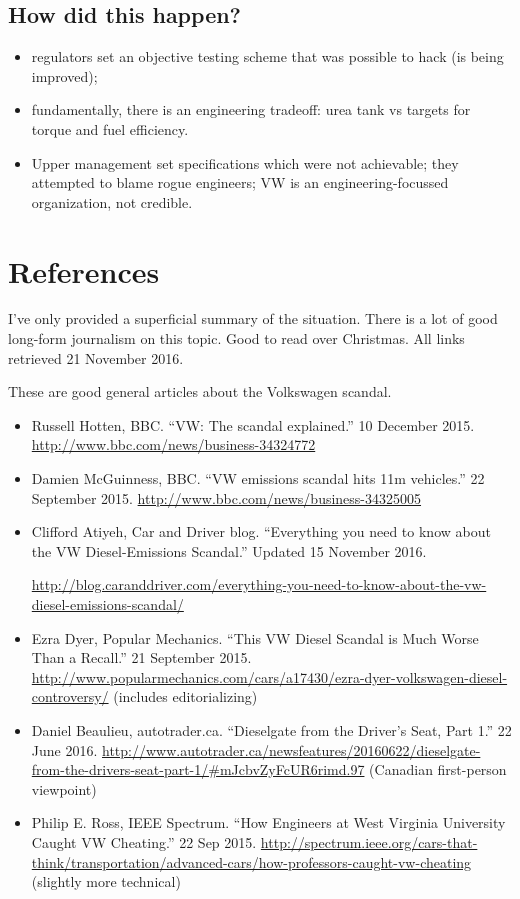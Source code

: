 \documentclass[11pt]{article}
\begin{document}
\subsection*{How did this happen?}
\begin{itemize}[noitemsep]
\item regulators set an objective testing scheme that was possible to hack (is being improved);
\item fundamentally, there is an engineering tradeoff: urea tank vs targets for torque and fuel efficiency.
\item Upper management set specifications which were not achievable; they attempted to blame rogue engineers; VW is an engineering-focussed organization, not credible.
\end{itemize}


\newpage
\section*{References}

I've only provided a superficial summary of the situation. There is a
lot of good long-form journalism on this topic. Good to read over Christmas.
All links retrieved 21 November 2016.

\noindent
These are good general articles about the Volkswagen scandal.

\begin{itemize}
\item Russell Hotten, BBC. ``VW: The scandal explained.'' 10 December 2015. \url{http://www.bbc.com/news/business-34324772}
\item Damien McGuinness, BBC. ``VW emissions scandal hits 11m vehicles.'' 22 September 2015. \url{http://www.bbc.com/news/business-34325005}
\item Clifford Atiyeh, Car and Driver blog. ``Everything you need to know about the VW Diesel-Emissions Scandal.'' Updated 15 November 2016. 

\url{http://blog.caranddriver.com/everything-you-need-to-know-about-the-vw-diesel-emissions-scandal/}
\item Ezra Dyer, Popular Mechanics. ``This VW Diesel Scandal is Much Worse Than a Recall.'' 21 September 2015. \url{http://www.popularmechanics.com/cars/a17430/ezra-dyer-volkswagen-diesel-controversy/} (includes editorializing)
\item Daniel Beaulieu, autotrader.ca. ``Dieselgate from the Driver's Seat, Part 1.'' 22 June 2016. \url{http://www.autotrader.ca/newsfeatures/20160622/dieselgate-from-the-drivers-seat-part-1/#mJcbvZyFcUR6rimd.97} (Canadian first-person viewpoint)
\item Philip E. Ross, IEEE Spectrum. ``How Engineers at West Virginia University Caught VW Cheating.'' 22 Sep 2015. \url{http://spectrum.ieee.org/cars-that-think/transportation/advanced-cars/how-professors-caught-vw-cheating} (slightly more technical)
\end{itemize}
\end{document}
